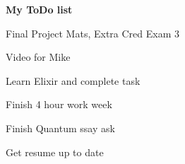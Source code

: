 \documentclass{article}
\begin{document}
\textbf{My ToDo list}

  \begin{todolist}
    \item Final Project Mats, Extra Cred Exam 3
    \item Video for Mike
    \item Learn Elixir and complete task
    \item Finish 4 hour work week
    \item Finish Quantum ssay ask
    \item Get resume up to date

  \end{todolist}
\end{document}
